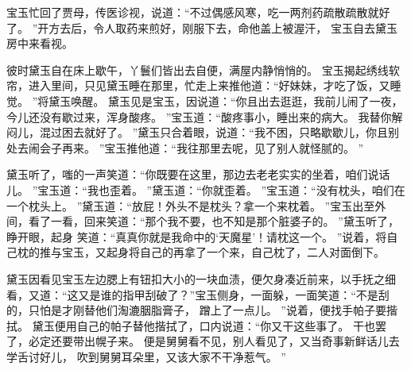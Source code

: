 宝玉忙回了贾母，传医诊视，说道：“不过偶感风寒，吃一两剂药疏散疏散就好了。
”开方去后，令人取药来煎好，刚服下去，命他盖上被渥汗，
宝玉自去黛玉房中来看视。
\par
彼时黛玉自在床上歇午，丫鬟们皆出去自便，满屋内静悄悄的。
宝玉揭起绣线软帘，进入里间，只见黛玉睡在那里，忙走上来推他道：“好妹妹，才吃了饭，又睡觉。
”将黛玉唤醒。
黛玉见是宝玉，因说道：“你且出去逛逛，我前儿闹了一夜，今儿还没有歇过来，浑身酸疼。
”宝玉道：“酸疼事小，睡出来的病大。
我替你解闷儿，混过困去就好了。
”黛玉只合着眼，说道：“我不困，只略歇歇儿，你且别处去闹会子再来。
”宝玉推他道：“我往那里去呢，见了别人就怪腻的。
”\par
黛玉听了，嗤的一声笑道：“你既要在这里，那边去老老实实的坐着，咱们说话儿。
”宝玉道：“我也歪着。
”黛玉道：“你就歪着。
”宝玉道：“没有枕头，咱们在一个枕头上。
”黛玉道：“放屁！外头不是枕头？拿一个来枕着。
”宝玉出至外间，看了一看，回来笑道：“那个我不要，也不知是那个脏婆子的。
”黛玉听了，睁开眼，起身
笑道：“真真你就是我命中的‘天魔星’！请枕这一个。
”说着，将自己枕的推与宝玉，又起身将自己的再拿了一个来，自己枕了，二人对面倒下。
\par
黛玉因看见宝玉左边腮上有钮扣大小的一块血渍，便欠身凑近前来，以手抚之细看，又道：“这又是谁的指甲刮破了？”宝玉侧身，一面躲，一面笑道：“不是刮的，只怕是才刚替他们淘漉胭脂膏子，
蹭上了一点儿。
”说着，便找手帕子要揩拭。
黛玉便用自己的帕子替他揩拭了，口内说道：“你又干这些事了。
干也罢了，必定还要带出幌子来。
便是舅舅看不见，别人看见了，又当奇事新鲜话儿去学舌讨好儿，
吹到舅舅耳朵里，又该大家不干净惹气。
”\par
